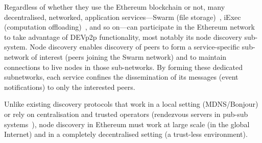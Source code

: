 



Regardless of whether they use the Ethereum blockchain or not, many decentralised, networked, application services---\eg Swarm (file storage)~\cite{}, iExec (computation offloading)~\cite{}, and so on---can participate in the Ethereum network to take advantage of DEVp2p functionality, most notably its node discovery sub-system. Node discovery enables discovery of peers to form a service-specific sub-network of interest (\eg peers joining the Swarm network) and to maintain connections to live nodes in those sub-networks. By forming these dedicated subnetworks, each service confines the dissemination of its messages (\eg event notifications) to only the interested peers.

Unlike existing discovery protocols that work in a local setting (MDNS/Bonjour) or rely on centralisation and trusted operators (\eg rendezvous servers in pub-sub systems~\cite{}), node discovery in Ethereum must work at large scale (in the global Internet) and in a completely decentralised setting  (\ie a trust-less environment). 

